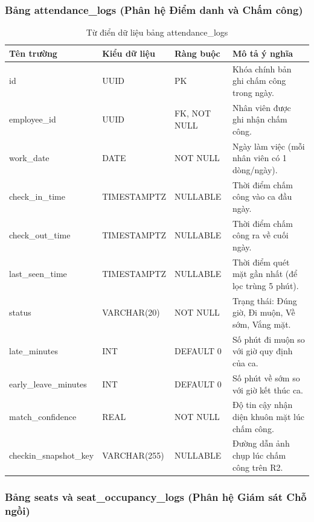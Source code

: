 \documentclass[12pt,a4paper]{article}
\begin{document}
\subsubsection{Bảng attendance\_logs (Phân hệ Điểm danh và Chấm công)}

\begin{longtable}{|M{\tabcolsep\relax}|L{\tabcolsep\relax}|L{\tabcolsep\relax}|L{\tabcolsep\relax}|}
\caption{Từ điển dữ liệu bảng attendance\_logs}\\
\hline
{}
\normalfont\footnotesize\textbf{Tên trường} & \textbf{Kiểu dữ liệu} & \textbf{Ràng buộc} & \textbf{Mô tả ý nghĩa} \\
\hline
id & UUID & PK & Khóa chính bản ghi chấm công trong ngày. \\
\hline
{}
employee\_id & UUID & FK, NOT NULL & Nhân viên được ghi nhận chấm công. \\
\hline
work\_date & DATE & NOT NULL & Ngày làm việc (mỗi nhân viên có 1 dòng/ngày). \\
\hline
{}
check\_in\_time & TIMESTAMPTZ & NULLABLE & Thời điểm chấm công vào ca đầu ngày. \\
\hline
check\_out\_time & TIMESTAMPTZ & NULLABLE & Thời điểm chấm công ra về cuối ngày. \\
\hline
{}
last\_seen\_time & TIMESTAMPTZ & NULLABLE & Thời điểm quét mặt gần nhất (để lọc trùng 5 phút). \\
\hline
status & VARCHAR(20) & NOT NULL & Trạng thái: Đúng giờ, Đi muộn, Về sớm, Vắng mặt. \\
\hline
{}
late\_minutes & INT & DEFAULT 0 & Số phút đi muộn so với giờ quy định của ca. \\
\hline
early\_leave\_minutes & INT & DEFAULT 0 & Số phút về sớm so với giờ kết thúc ca. \\
\hline
{}
match\_confidence & REAL & NOT NULL & Độ tin cậy nhận diện khuôn mặt lúc chấm công. \\
\hline
checkin\_snapshot\_key & VARCHAR(255) & NULLABLE & Đường dẫn ảnh chụp lúc chấm công trên R2. \\
\hline
\end{longtable}

\subsubsection{Bảng seats và seat\_occupancy\_logs (Phân hệ Giám sát Chỗ ngồi)}
\end{document}
